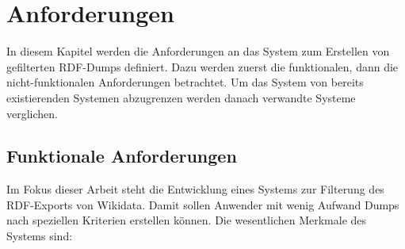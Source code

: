 \chapter{Anforderungen}
\label{chap:requirements}
In diesem Kapitel werden die Anforderungen an das System zum Erstellen von gefilterten RDF-Dumps definiert.
Dazu werden zuerst die funktionalen, dann die nicht-funktionalen Anforderungen betrachtet.
Um das System von bereits existierenden Systemen abzugrenzen werden danach verwandte Systeme verglichen.

\section{Funktionale Anforderungen}
Im Fokus dieser Arbeit steht die Entwicklung eines Systems zur Filterung des RDF-Exports von Wikidata.
Damit sollen Anwender mit wenig Aufwand Dumps nach speziellen Kriterien erstellen können.
Die wesentlichen Merkmale des Systems sind:

